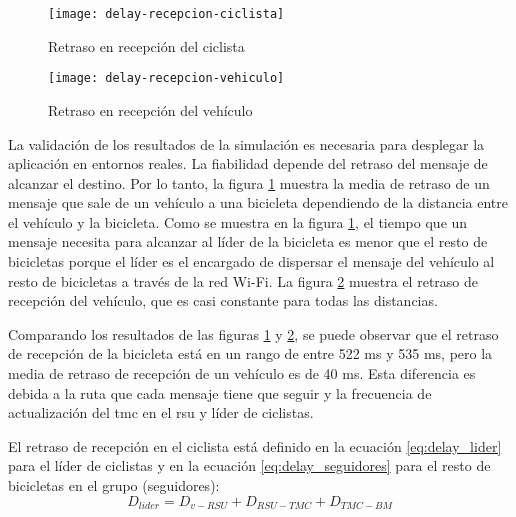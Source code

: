 \begin{figure}[t]
	\texttt{[image: delay-recepcion-ciclista]}
	\caption{Retraso en recepción del ciclista}
	\label{fig:delay-recepcion-ciclista}
\end{figure}

\begin{figure}[t]
	\texttt{[image: delay-recepcion-vehiculo]}
	\caption{Retraso en recepción del vehículo}
	\label{fig:delay-recepcion-vehiculo}
\end{figure}

La validación de los resultados de la simulación es necesaria para desplegar la aplicación en entornos reales. La fiabilidad depende del retraso del mensaje de alcanzar el destino. Por lo tanto, la figura \ref{fig:delay-recepcion-ciclista} muestra la media de retraso de un mensaje que sale de un vehículo a una bicicleta dependiendo de la distancia entre el vehículo y la bicicleta. Como se muestra en la figura \ref{fig:delay-recepcion-ciclista}, el tiempo que un mensaje necesita para alcanzar al líder de la bicicleta es menor que el resto de bicicletas porque el líder es el encargado de dispersar el mensaje del vehículo al resto de bicicletas a través de la red Wi-Fi. La figura \ref{fig:delay-recepcion-vehiculo} muestra el retraso de recepción del vehículo, que es casi constante para todas las distancias.

Comparando los resultados de las figuras \ref{fig:delay-recepcion-ciclista} y \ref{fig:delay-recepcion-vehiculo}, se puede observar que el retraso de recepción de la bicicleta está en un rango de entre 522 ms y 535 ms, pero la media de retraso de recepción de un vehículo es de 40 ms. Esta diferencia es debida a la ruta que cada mensaje tiene que seguir y la frecuencia de actualización del \gls{tmc} en el \gls{rsu} y líder de ciclistas.

El retraso de recepción en el ciclista está definido en la ecuación \ref{eq:delay_lider} para el líder de ciclistas y en la ecuación \ref{eq:delay_seguidores} para el resto de bicicletas en el grupo (seguidores):
\begin{equation}\label{eq:delay_lider}
D_{lider} = D_{v-RSU} + D_{RSU-TMC} + D_{TMC-BM}
\end{equation}

